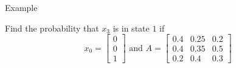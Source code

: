 \documentclass{beamer}
\begin{document}
\begin{frame}{Example}
\begin{example}
	Find the probability that $x_3$ is in state $1$ if
	\begin{equation*}
	x_0 = \left[
	\begin{matrix}
	0\\
	0\\
	1
	\end{matrix}
	\right] \text{ and }
	A = \left[
	\begin{matrix}
	0.4&0.25&0.2\\
	0.4&0.35&0.5\\
	0.2&0.4& 0.3
	\end{matrix}
	\right]
	\end{equation*}
\end{example}
\end{frame}
\end{document}
